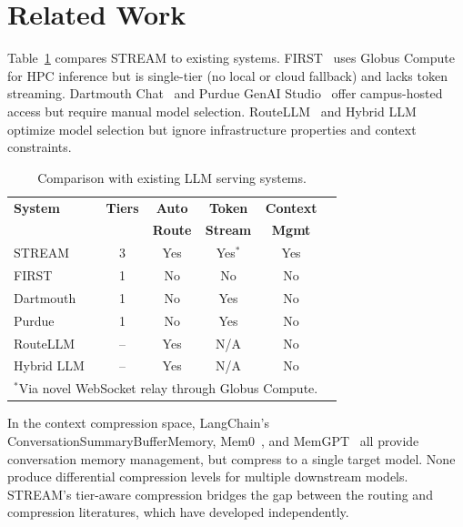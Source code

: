 \documentclass[manuscript, review]{acmart}
\begin{document}
\section{Related Work}

Table~\ref{tab:comparison} compares STREAM to existing systems. FIRST~\cite{first2025} uses Globus Compute for HPC inference but is single-tier (no local or cloud fallback) and lacks token streaming. Dartmouth Chat~\cite{dartmouth2025} and Purdue GenAI Studio~\cite{purdue2025} offer campus-hosted access but require manual model selection. RouteLLM~\cite{routellm2024} and Hybrid LLM~\cite{hybridllm2024} optimize model selection but ignore infrastructure properties and context constraints.

\begin{table}[h]
\centering
\caption{Comparison with existing LLM serving systems.}
\label{tab:comparison}
\small
\begin{tabular}{@{}lccccc@{}}
\toprule
\textbf{System} & \textbf{Tiers} & \textbf{Auto} & \textbf{Token} & \textbf{Context} \\
                &                & \textbf{Route} & \textbf{Stream} & \textbf{Mgmt} \\
\midrule
STREAM           & 3 & Yes & Yes$^*$  & Yes \\
FIRST~\cite{first2025}            & 1 & No  & No       & No \\
Dartmouth~\cite{dartmouth2025}    & 1 & No  & Yes      & No \\
Purdue~\cite{purdue2025}          & 1 & No  & Yes      & No \\
RouteLLM~\cite{routellm2024}     & -- & Yes & N/A      & No \\
Hybrid LLM~\cite{hybridllm2024}  & -- & Yes & N/A      & No \\
\bottomrule
\multicolumn{5}{l}{\scriptsize $^*$Via novel WebSocket relay through Globus Compute.}
\end{tabular}
\end{table}

In the context compression space, LangChain's ConversationSummaryBufferMemory, Mem0~\cite{mem0_2025}, and MemGPT~\cite{memgpt2023} all provide conversation memory management, but compress to a single target model. None produce differential compression levels for multiple downstream models. STREAM's tier-aware compression bridges the gap between the routing and compression literatures, which have developed independently.

\end{document}
